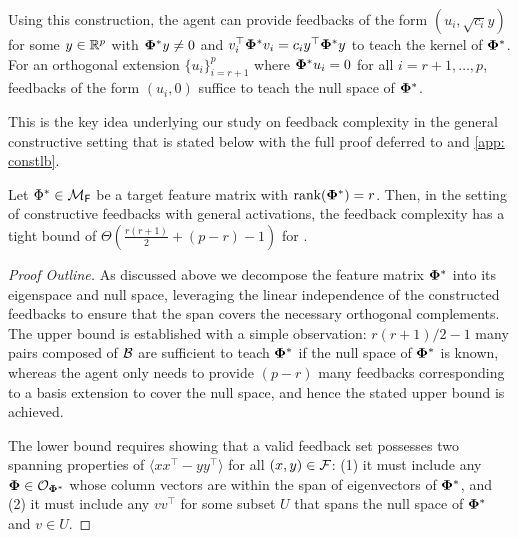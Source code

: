 Using this construction, the agent can provide feedbacks of the form $(u_i, \sqrt{c_i} y)$ for some $y \in \mathbb{R}^p$ with $\boldsymbol{\Phi}^* y \neq 0$ and $v_i^\top \boldsymbol{\Phi}^* v_i = c_i y^\top \boldsymbol{\Phi}^* y$ to teach the kernel of $\boldsymbol{\Phi}^*$. For an orthogonal extension $\{u_i\}_{i=r+1}^p$ where $\boldsymbol{\Phi}^* u_i = 0$ for all $i = r+1,\dots,p$, feedbacks of the form $(u_i, 0)$ suffice to teach the null space of $\boldsymbol{\Phi}^*$.

This is the key idea underlying our study on feedback complexity in the general constructive setting that is stated below with the full proof deferred to  and \ref{app: constlb}.

\begin{theorem}\label{thm: constructgeneral}
    Let $\Phi^* \in {\mathcal{M}}_{\textsf{F}}$ be a target feature matrix with $\text{rank}({\boldsymbol{\Phi}^*}) = r$. Then, in the setting of constructive feedbacks with general activations, the feedback complexity has a tight bound of $\Theta\left(\frac{r(r+1)}{2} + (p - r) - 1\right)$ for .
\end{theorem}

\begin{proof}[Proof Outline]
    As discussed above we decompose the feature matrix $\boldsymbol{\Phi}^*$ into its eigenspace and null space, leveraging the linear independence of the constructed feedbacks to ensure that the span covers the necessary orthogonal complements. 
    The upper bound is established with a simple observation: $r(r+1)/2 - 1$ many pairs composed of ${\mathcal{B}}$ are sufficient to teach $\boldsymbol{\Phi}^*$ if the null space of $\boldsymbol{\Phi}^*$ is known, whereas the agent only needs to provide $(p-r)$ many feedbacks corresponding to a basis extension to cover the null space, and hence the stated upper bound is achieved.
    
    The lower bound requires showing that a valid feedback set possesses two spanning properties of $\langle{xx^\top - yy^\top\rangle}$ for all $(x,y) \in {\mathcal{F}}$: (1) it must include any $\boldsymbol{\Phi} \in \mathcal{O}_{\boldsymbol{\Phi}^*}$ whose column vectors are within the span of eigenvectors of $\boldsymbol{\Phi}^*$, and (2) it must include any $vv^\top$ for some subset $U$ that spans the null space of $\boldsymbol{\Phi}^*$ and $v \in U$.
\end{proof}

